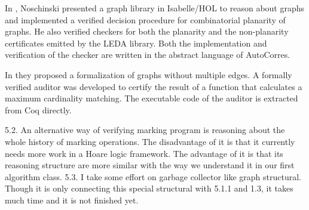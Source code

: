 In \cite{noschinski2015formalizing}, Noschinski presented a graph
library in Isabelle/HOL to reason about graphs and implemented a
verified decision procedure for combinatorial planarity of graphs. He
also verified checkers for both the planarity and the non-planarity
certificates emitted by the LEDA library. Both the implementation and
verification of the checker are written in the abstract language of
AutoCorres.

In \cite{dubois2015graphes} they proposed a formalization of graphs
without multiple edges. A formally verified auditor was developed to
certify the result of a function that calculates a maximum cardinality
matching. The executable code of the auditor is extracted from Coq
directly.

{\color{magenta}
5.2. An alternative way of verifying marking program is reasoning about the whole history of marking operations. The disadvantage of it is that it currently needs more work in a Hoare logic framework. The advantage of it is that its reasoning structure are more similar with the way we understand it in our first algorithm class.
5.3. I take some effort on garbage collector like graph structural. Though it is only connecting this special structural with 5.1.1 and 1.3, it takes much time and it is not finished yet.}


